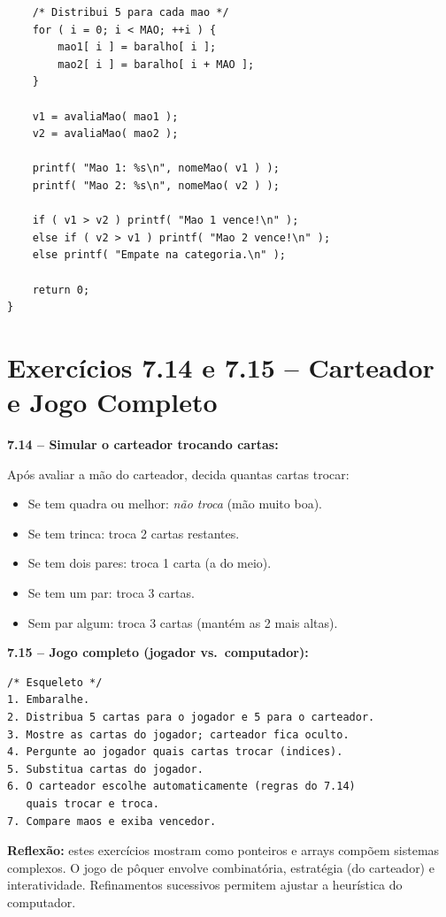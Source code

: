 \documentclass[12pt,a4paper]{article}
\begin{document}
\begin{respostabox}
\begin{lstlisting}
    /* Distribui 5 para cada mao */
    for ( i = 0; i < MAO; ++i ) {
        mao1[ i ] = baralho[ i ];
        mao2[ i ] = baralho[ i + MAO ];
    }

    v1 = avaliaMao( mao1 );
    v2 = avaliaMao( mao2 );

    printf( "Mao 1: %s\n", nomeMao( v1 ) );
    printf( "Mao 2: %s\n", nomeMao( v2 ) );

    if ( v1 > v2 ) printf( "Mao 1 vence!\n" );
    else if ( v2 > v1 ) printf( "Mao 2 vence!\n" );
    else printf( "Empate na categoria.\n" );

    return 0;
}
\end{lstlisting}
\end{respostabox}

\newpage

\section{Exercícios 7.14 e 7.15 -- Carteador e Jogo Completo}

\begin{respostabox}
\textbf{7.14 -- Simular o carteador trocando cartas:}

Após avaliar a mão do carteador, decida quantas cartas trocar:
\begin{itemize}[noitemsep]
  \item Se tem quadra ou melhor: \textit{não troca} (mão muito boa).
  \item Se tem trinca: troca 2 cartas restantes.
  \item Se tem dois pares: troca 1 carta (a do meio).
  \item Se tem um par: troca 3 cartas.
  \item Sem par algum: troca 3 cartas (mantém as 2 mais altas).
\end{itemize}

\textbf{7.15 -- Jogo completo (jogador vs.\ computador):}

\begin{lstlisting}
/* Esqueleto */
1. Embaralhe.
2. Distribua 5 cartas para o jogador e 5 para o carteador.
3. Mostre as cartas do jogador; carteador fica oculto.
4. Pergunte ao jogador quais cartas trocar (indices).
5. Substitua cartas do jogador.
6. O carteador escolhe automaticamente (regras do 7.14)
   quais trocar e troca.
7. Compare maos e exiba vencedor.
\end{lstlisting}

\textbf{Reflexão:} estes exercícios mostram como ponteiros e arrays compõem
sistemas complexos. O jogo de pôquer envolve combinatória, estratégia (do
carteador) e interatividade. Refinamentos sucessivos permitem ajustar a
heurística do computador.
\end{respostabox}
\end{document}
